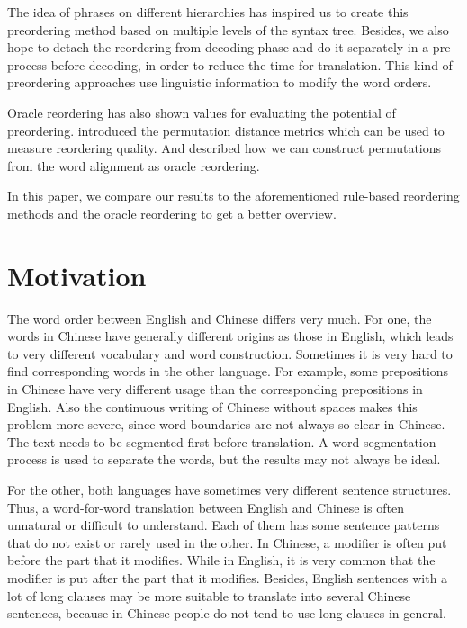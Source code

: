 \documentclass[a4paper]{article}
\begin{document}
The idea of phrases on different hierarchies has inspired us to create this preordering method based on multiple levels of the syntax tree. Besides, we also hope to detach the reordering from decoding phase and do it separately in a pre-process before decoding, in order to reduce the time for translation. This kind of preordering approaches use linguistic information to modify the word orders.

Oracle reordering has also shown values for evaluating the potential of preordering. \cite{metrics} introduced the permutation distance metrics which can be used to measure reordering quality. And \cite{birch2} described how we can construct permutations from the word alignment as oracle reordering.

In this paper, we compare our results to the aforementioned rule-based reordering methods and the oracle reordering to get a better overview.

\section{Motivation}
\label{mo}

The word order between English and Chinese differs very much. For one, the words in Chinese have generally different origins as those in English, which leads to very different vocabulary and word construction. Sometimes it is very hard to find corresponding words in the other language. For example, some prepositions in Chinese have very different usage than the corresponding prepositions in English. Also the continuous writing of Chinese without spaces makes this problem more severe, since word boundaries are not always so clear in Chinese. The text needs to be segmented first before translation. A word segmentation process is used to separate the words, but the results may not always be ideal.

For the other, both languages have sometimes very different sentence structures. Thus, a word-for-word translation between English and Chinese is often unnatural or difficult to understand. Each of them has some sentence patterns that do not exist or rarely used in the other. In Chinese, a modifier is often put before the part that it modifies. While in English, it is very common that the modifier is put after the part that it modifies. Besides, English sentences with a lot of long clauses may be more suitable to translate into several Chinese sentences, because in Chinese people do not tend to use long clauses in general. 
\end{document}
